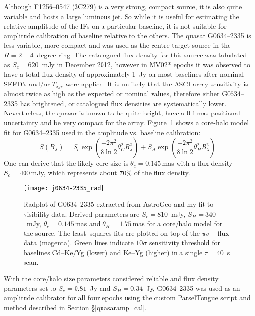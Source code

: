 			Although F1256--0547 (3C279) is a very strong, compact source, it is also quite variable and hosts a large luminous jet. So while it is useful for estimating the relative amplitude of the IFs on a particular baseline, it is not suitable for amplitude calibration of baseline relative to the others. The quasar G0634--2335 is less variable, more compact and was used as the centre target source in the $R=2-4$~degree ring. The catalogued flux density for this source was tabulated as $S_c=620$~mJy in December 2012, however in MV02* epochs it was observed to have a total flux density of approximately 1~Jy on most baselines after nominal SEFD's and/or $T_{sys}$ were applied. It is unlikely that the ASCI array sensitivity is almost twice as high as the expected or nominal values, therefore either G0634--2335 has brightened, or catalogued flux densities are systematically lower. Nevertheless, the quasar is known to be quite bright, have a 0.1\,mas positional uncertainty and be very compact for the array. \hyperref[g0634_rad_python]{Figure~\ref*{g0634_rad_python}} shows a core-halo model fit for G0634--2335 used in the amplitude vs. baseline calibration:
			\begin{equation*}
				S(B_\lambda) = S_c \exp\left({\frac{-2\pi^2}{8\ln 2}\theta_C^2 B_\lambda^2}\right) + S_H \exp\left({\frac{-2\pi^2}{8\ln 2}\theta_H^2 B_\lambda^2}\right)
			\end{equation*}
			One can derive that the likely core size is $\theta_c=0.145$\,mas with a flux density $S_c=400$\,mJy, which represents about 70\% of the flux density. 
			\begin{figure}[h]
				\centering
				\texttt{[image: j0634-2335\_rad]}
				\caption[G0634-2335 Radplot]{Radplot of G0634--2335 extracted from AstroGeo and my fit to visibility data. Derived parameters are $S_c = 810$~mJy, $S_H=340$~mJy, $\theta_c=0.145$\,mas and $\theta_H=1.75$\,mas for a core/halo model for the source. The least--squares fits are plotted on top of the $uv-$flux data (magenta). Green lines indicate $10\sigma$ sensitivity threshold for baselines Cd--Ke/Yg (lower) and Ke--Yg (higher) in a single $\tau=40$~s scan.}
				\label{g0634_rad_python}
			\end{figure}
	
		With the core/halo size parameters considered reliable and flux density parameters set to $S_c =0.81$~Jy and $S_H=0.34$~Jy, G0634--2335 was used as an amplitude calibrator for all four epochs using the custom ParselTongue script and method described in \hyperref[quasaramp_cal]{Section \S\ref*{quasaramp_cal}}.

